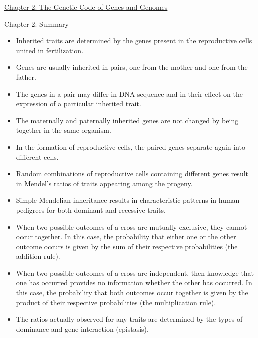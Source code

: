 \documentclass[12pt,letterpaper]{article}
\newcommand{\thetitle}{\hypertarget{home}{Essential Genetics and Genomics}}
\begin{document}
\clearpage

\renewcommand{\thetitle}{\hypertarget{2}{The Genetic Code of Genes
and Genomes}}
\hypertarget{2}{} 
\hypertarget{2.r}{}
\begin{chapbox}{\hyperlink{home}{Chapter 2: The Genetic Code of Genes and Genomes}}
\begin{probbox}{Chapter 2: Summary}{
    \begin{itemize}
        \item Inherited traits are determined by the genes present in the reproductive cells united in fertilization. 
        \item  Genes are usually inherited in pairs, one from the mother and one from the father. 
        \item  The genes in a pair may differ in DNA sequence and in their effect on the expression of a particular inherited trait. 
        \item  The maternally and paternally inherited genes are not changed by being together in the same organism. 
        \item  In the formation of reproductive cells, the paired genes separate again into different cells. 
        \item  Random combinations of reproductive cells containing different genes result in Mendel’s ratios of traits appearing among the progeny. 
        \item  Simple Mendelian inheritance results in characteristic patterns in human pedigrees for both dominant and recessive traits. 
        \item  When two possible outcomes of a cross are mutually exclusive, they cannot occur together. In this case, the probability that either one or the other outcome occurs is given by the sum of their respective probabilities (the addition rule). 
        \item  When two possible outcomes of a cross are independent, then knowledge that one has occurred provides no information whether the other has occurred. In this case, the probability that both outcomes occur together is given by the product of their respective probabilities (the multiplication rule). 
        \item  The ratios actually observed for any traits are determined by the types of dominance and gene interaction (epistasis).
    \end{itemize}
}\end{probbox}
\end{chapbox}
\end{document}
